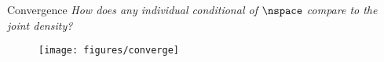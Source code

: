 \begin{block}{Convergence}
\large
    \emph{How does any individual conditional of $\nspace$ compare to the joint density?}

    \begin{figure}
        \texttt{[image: figures/converge]}
    \end{figure}

\end{block}
\vspace{-1cm}

